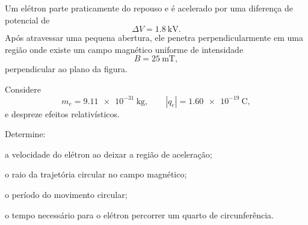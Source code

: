 \begin{questao}[4]{}


Um elétron parte praticamente do repouso e é acelerado por uma diferença de
potencial de
\[
\Delta V=\SI{1.8}{\kilo\volt}.
\]
Após atravessar uma pequena abertura, ele penetra perpendicularmente em uma
região onde existe um campo magnético uniforme de intensidade
\[
B=\SI{25}{\milli\tesla},
\]
perpendicular ao plano da figura.

Considere
\[
m_e=\SI{9.11e-31}{\kilogram},
\qquad
|q_e|=\SI{1.60e-19}{\coulomb},
\]
e despreze efeitos relativísticos.

Determine:

\begin{itensq}
    \item a velocidade do elétron ao deixar a região de aceleração;
    \item o raio da trajetória circular no campo magnético;
    \item o período do movimento circular;
    \item o tempo necessário para o elétron percorrer um quarto de circunferência.
\end{itensq}

\begin{center}
\end{center}
\end{questao}
